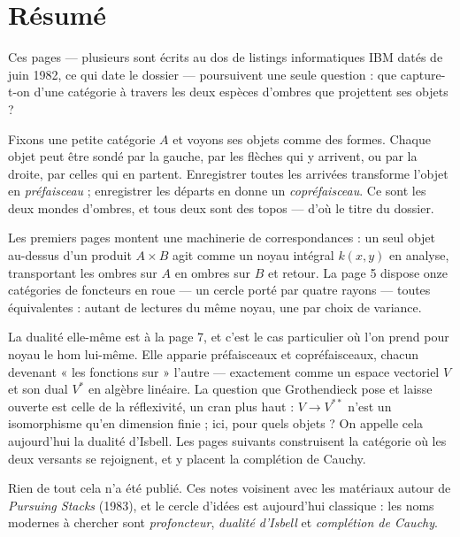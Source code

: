 \documentclass[11pt,a4paper]{article}
\begin{document}
\section*{Résumé}

\begin{resume}
Ces pages — plusieurs sont écrits au dos de listings informatiques IBM
datés de juin 1982, ce qui date le dossier — poursuivent une seule question :
que capture-t-on d'une catégorie à travers les deux espèces d'ombres que
projettent ses objets ?

Fixons une petite catégorie $A$ et voyons ses objets comme des formes. Chaque
objet peut être sondé par la gauche, par les flèches qui y arrivent, ou par la
droite, par celles qui en partent. Enregistrer toutes les arrivées transforme
l'objet en \emph{préfaisceau} ; enregistrer les départs en donne un
\emph{copréfaisceau}. Ce sont les deux mondes d'ombres, et tous deux sont des
topos — d'où le titre du dossier.

Les premiers pages montent une machinerie de correspondances : un seul
objet au-dessus d'un produit $A \times B$ agit comme un noyau intégral
$k(x,y)$ en analyse, transportant les ombres sur $A$ en ombres sur $B$ et
retour. La page 5 dispose onze catégories de foncteurs en roue — un
cercle porté par quatre rayons — toutes équivalentes : autant de lectures du
même noyau, une par choix de variance.

La dualité elle-même est à la page 7, et c'est le cas particulier où l'on
prend pour noyau le hom lui-même. Elle apparie préfaisceaux et copréfaisceaux,
chacun devenant « les fonctions sur » l'autre — exactement comme un espace
vectoriel $V$ et son dual $V^{*}$ en algèbre linéaire. La question que
Grothendieck pose et laisse ouverte est celle de la réflexivité, un cran plus
haut : $V \to V^{**}$ n'est un isomorphisme qu'en dimension finie ; ici, pour
quels objets ? On appelle cela aujourd'hui la dualité d'Isbell. Les pages
suivants construisent la catégorie où les deux versants se rejoignent, et y
placent la complétion de Cauchy.

Rien de tout cela n'a été publié. Ces notes voisinent avec les matériaux
autour de \emph{Pursuing Stacks} (1983), et le cercle d'idées est aujourd'hui
classique : les noms modernes à chercher sont \emph{profoncteur},
\emph{dualité d'Isbell} et \emph{complétion de Cauchy}.

\end{resume}
\end{document}
